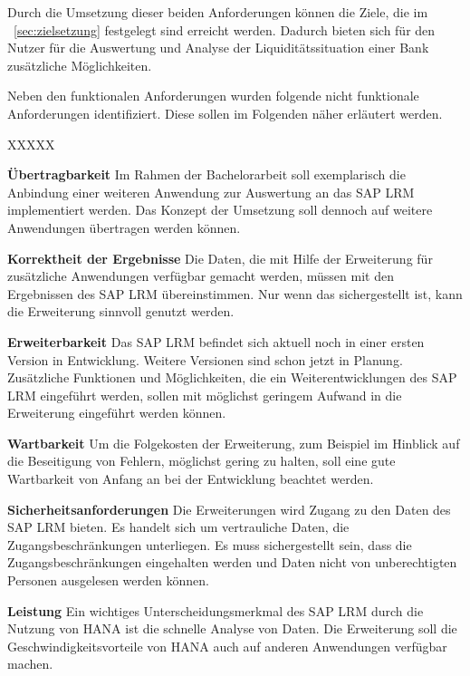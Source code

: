Durch die Umsetzung dieser beiden  Anforderungen können die Ziele, die im ~\ref{sec:zielsetzung} festgelegt sind erreicht werden. Dadurch bieten sich für den Nutzer für die Auswertung und Analyse der Liquiditätssituation einer Bank zusätzliche Möglichkeiten.

Neben den funktionalen Anforderungen wurden folgende nicht funktionale Anforderungen identifiziert. Diese sollen im Folgenden näher erläutert werden.

\begin{seToplist}{ XXXXX }

\item[\anfl{übertragbarkeit}] \textbf{Übertragbarkeit} \newline
Im Rahmen der Bachelorarbeit soll exemplarisch die Anbindung einer weiteren Anwendung zur Auswertung an das SAP LRM implementiert werden. Das Konzept der Umsetzung soll dennoch auf weitere Anwendungen übertragen werden können.

\item[\anfl{korrektheit}] \textbf{Korrektheit der Ergebnisse} \newline
Die Daten, die mit Hilfe der Erweiterung für zusätzliche Anwendungen verfügbar gemacht werden, müssen mit den Ergebnissen des SAP LRM übereinstimmen. Nur wenn das sichergestellt ist, kann die Erweiterung sinnvoll genutzt werden.

\item[\anfl{erweiterbarkeit}] \textbf{Erweiterbarkeit} \newline
Das SAP LRM befindet sich aktuell noch in einer ersten Version in Entwicklung. Weitere Versionen sind schon jetzt in Planung. Zusätzliche Funktionen und Möglichkeiten, die ein Weiterentwicklungen des SAP LRM eingeführt werden, sollen mit möglichst geringem Aufwand in die Erweiterung eingeführt werden können.

\item[\anfl{wartbarkeit}] \textbf{Wartbarkeit} \newline
Um die Folgekosten der Erweiterung, zum Beispiel im Hinblick auf die Beseitigung von Fehlern, möglichst gering zu halten, soll eine gute Wartbarkeit von Anfang an bei der Entwicklung beachtet werden.

\item[\anfl{sicherheit}] \textbf{Sicherheitsanforderungen} \newline
Die Erweiterungen wird Zugang zu den Daten des SAP LRM bieten. Es handelt sich um vertrauliche Daten, die  Zugangsbeschränkungen unterliegen. Es muss sichergestellt sein, dass die Zugangsbeschränkungen eingehalten werden und Daten nicht von unberechtigten Personen ausgelesen werden können.

\item[\anfl{leistung}] \textbf{Leistung} \newline
Ein wichtiges Unterscheidungsmerkmal des SAP LRM durch die Nutzung von \gls{HANA} ist die schnelle Analyse von Daten. Die Erweiterung soll die Geschwindigkeitsvorteile von \gls{HANA} auch auf anderen Anwendungen verfügbar machen.

\end{seToplist}

